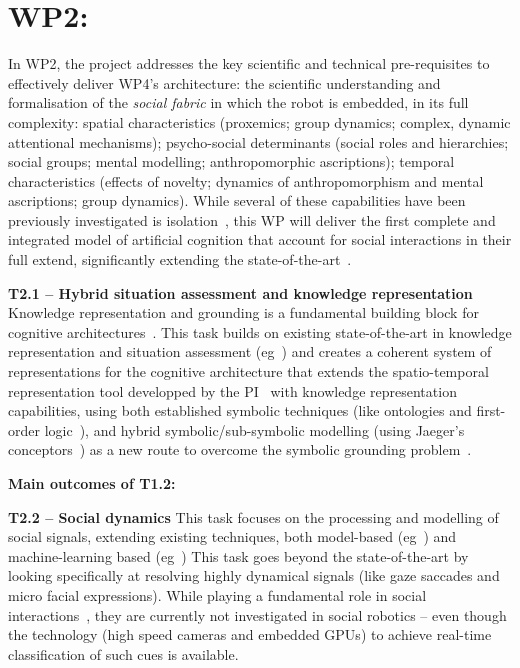 \documentclass[11pt,a4paper]{report}
\begin{document}
\section{WP2: \textbf{\wpTwo}}

In WP2, the project addresses the key scientific and technical pre-requisites to
effectively deliver WP4's architecture:  the scientific understanding and
formalisation of the \emph{social fabric} in which the robot is embedded, in its
full complexity: spatial characteristics (proxemics; group dynamics; complex,
dynamic attentional mechanisms); psycho-social determinants (social roles and
hierarchies; social groups; mental modelling; anthropomorphic ascriptions);
temporal characteristics (effects of novelty; dynamics of anthropomorphism and
mental ascriptions; group dynamics).  While several of these capabilities have
been previously investigated is isolation~\cite{lemaignan2014dynamics,
flook2019impact,lemaignan2015youre, fink2014which, ros2010which,
warnier2012when, lemaignan2015mutual, dillenbourg2016symmetry,
winkle2019effective}, this WP will deliver the first complete and integrated
model of artificial cognition that account for social interactions in their full
extend, significantly extending the state-of-the-art~\cite{lemaignan2017artificial,
baxter2016cognitive}.


\textbf{T2.1 -- Hybrid situation assessment and knowledge representation}
Knowledge representation and grounding is a fundamental building block for
cognitive architectures~\cite{lemaignan2017artificial,beetz2010cram}. This task
builds on existing state-of-the-art in knowledge representation and situation
assessment (eg~\cite{citeneeded}) and creates a coherent system of
representations for the cognitive architecture that extends the 
spatio-temporal representation tool developped by the
PI~\cite{lemaignan2018underworlds,sallami2019simulation} with knowledge
representation capabilities, using both established symbolic techniques (like
ontologies and first-order logic~\cite{lemaignan2010oro, tenorth2009knowrob}),
and hybrid symbolic/sub-symbolic modelling (using Jaeger's
conceptors~\cite{jaeger2014controlling}) as a new route to overcome the symbolic
grounding problem~\cite{harnad1990symbol}.

\begin{framed}
    {\bf Main outcomes of T1.2:}
\end{framed}

\textbf{T2.2 -- Social dynamics} This task focuses on the processing and
modelling of social signals, extending existing techniques, both model-based
(eg~\cite{lemaignan2016realtime,others}) and machine-learning based
(eg~\cite{chetouani,others}) This task goes beyond the state-of-the-art by
looking specifically at resolving highly dynamical signals (like gaze saccades
and micro facial expressions). While playing a fundamental role in social
interactions~\cite{citeneeded}, they are currently not investigated in social
robotics -- even though the technology (high speed cameras and embedded GPUs) to
achieve real-time classification of such cues is available.
\end{document}
